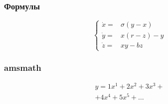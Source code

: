 
\begin{frame}
    \frametitle{Формулы}
    \[
    \left\{
    \begin{array}{rl}
        \dot x = & \sigma (y-x)  \\
        \dot y = & x (r - z) - y \\
        \dot z = & xy - bz
    \end{array}
    \right.
    \]
\end{frame}

\begin{frame}
    \frametitle{amsmath}
    \centering
    \begin{minipage}[t]{0.5\linewidth}
        \begin{multline*}
            y = 1 x^1 + 2 x^2 + 3 x^3 + \\ + 4 x^4 + 5 x^5 + \dots
        \end{multline*}
    \end{minipage}
\end{frame}

